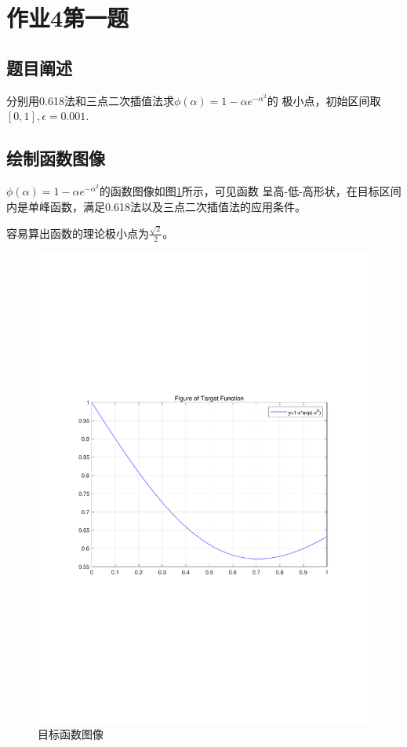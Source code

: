 

    
    
    \maketitle
    \newpage


    \newpage
    \section{作业4第一题}
    \subsection{题目阐述}
    分别用0.618法和三点二次插值法求$ \phi(\alpha) = 1-\alpha e^{-\alpha^2}  $的
    极小点，初始区间取$ [0,1] ,\epsilon = 0.001$.
    \subsection{绘制函数图像}
    $ \phi(\alpha) = 1-\alpha e^{-\alpha^2}  $的函数图像如图\ref{1_Func}所示，可见函数
    呈高-低-高形状，在目标区间内是单峰函数，满足0.618法以及三点二次插值法的应用条件。
    \par
    容易算出函数的理论极小点为$ \frac{\sqrt{2}}{2} $。 
    \begin{figure}[h!]
        \centering
        \includegraphics[width = 14cm]{第一题-Func.pdf}
        \caption[]{目标函数图像}\label{1_Func}
    \end{figure}
    \newpage
